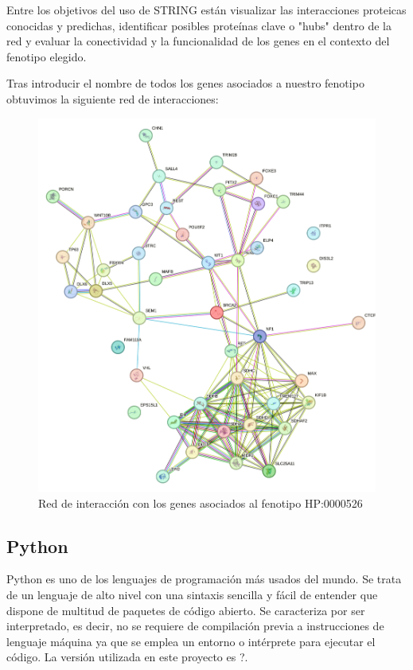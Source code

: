 Entre los objetivos del uso de STRING están visualizar las interacciones proteicas conocidas y predichas, identificar posibles proteínas clave o "hubs" dentro de la red y evaluar la conectividad y la funcionalidad de los genes en el contexto del fenotipo elegido.
	
Tras introducir el nombre de todos los genes asociados a nuestro fenotipo obtuvimos la siguiente red de interacciones:

\newpage

\begin{figure}[h] %
	\centering
	\includegraphics[width=1\textwidth]{figures/red_interaccion_aniridia.png} %
	\caption{Red de interacción con los genes asociados al fenotipo HP:0000526} %
	\label{fig:mi-imagen} %
\end{figure}

\subsection{Python}
Python es uno de los lenguajes de programación más usados del mundo. Se trata de un lenguaje de alto nivel con una sintaxis sencilla y fácil de entender que dispone de multitud de paquetes de código abierto. Se caracteriza por ser interpretado, es decir, no se requiere de compilación previa a instrucciones de lenguaje máquina ya que se emplea un entorno o intérprete para ejecutar el código.
La versión utilizada en este proyecto es ?.

